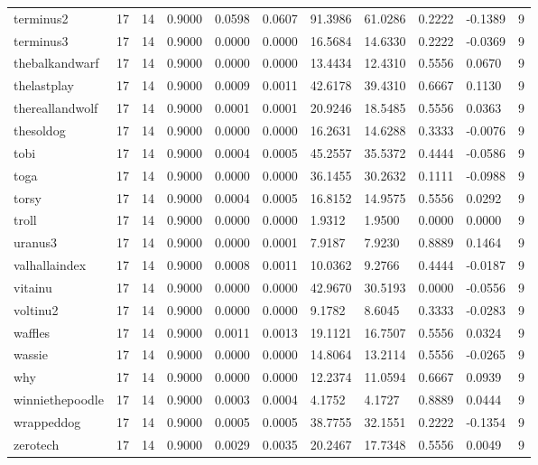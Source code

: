 \begin{table}[htbp]
\begin{tabular}{lllllllllll}
terminus2 & 17 & 14 & 0.9000 & 0.0598 & 0.0607 & 91.3986 & 61.0286 & 0.2222 & -0.1389 & 9 \\
terminus3 & 17 & 14 & 0.9000 & 0.0000 & 0.0000 & 16.5684 & 14.6330 & 0.2222 & -0.0369 & 9 \\
thebalkandwarf & 17 & 14 & 0.9000 & 0.0000 & 0.0000 & 13.4434 & 12.4310 & 0.5556 & 0.0670 & 9 \\
thelastplay & 17 & 14 & 0.9000 & 0.0009 & 0.0011 & 42.6178 & 39.4310 & 0.6667 & 0.1130 & 9 \\
thereallandwolf & 17 & 14 & 0.9000 & 0.0001 & 0.0001 & 20.9246 & 18.5485 & 0.5556 & 0.0363 & 9 \\
thesoldog & 17 & 14 & 0.9000 & 0.0000 & 0.0000 & 16.2631 & 14.6288 & 0.3333 & -0.0076 & 9 \\
tobi & 17 & 14 & 0.9000 & 0.0004 & 0.0005 & 45.2557 & 35.5372 & 0.4444 & -0.0586 & 9 \\
toga & 17 & 14 & 0.9000 & 0.0000 & 0.0000 & 36.1455 & 30.2632 & 0.1111 & -0.0988 & 9 \\
torsy & 17 & 14 & 0.9000 & 0.0004 & 0.0005 & 16.8152 & 14.9575 & 0.5556 & 0.0292 & 9 \\
troll & 17 & 14 & 0.9000 & 0.0000 & 0.0000 & 1.9312 & 1.9500 & 0.0000 & 0.0000 & 9 \\
uranus3 & 17 & 14 & 0.9000 & 0.0000 & 0.0001 & 7.9187 & 7.9230 & 0.8889 & 0.1464 & 9 \\
valhallaindex & 17 & 14 & 0.9000 & 0.0008 & 0.0011 & 10.0362 & 9.2766 & 0.4444 & -0.0187 & 9 \\
vitainu & 17 & 14 & 0.9000 & 0.0000 & 0.0000 & 42.9670 & 30.5193 & 0.0000 & -0.0556 & 9 \\
voltinu2 & 17 & 14 & 0.9000 & 0.0000 & 0.0000 & 9.1782 & 8.6045 & 0.3333 & -0.0283 & 9 \\
waffles & 17 & 14 & 0.9000 & 0.0011 & 0.0013 & 19.1121 & 16.7507 & 0.5556 & 0.0324 & 9 \\
wassie & 17 & 14 & 0.9000 & 0.0000 & 0.0000 & 14.8064 & 13.2114 & 0.5556 & -0.0265 & 9 \\
why & 17 & 14 & 0.9000 & 0.0000 & 0.0000 & 12.2374 & 11.0594 & 0.6667 & 0.0939 & 9 \\
winniethepoodle & 17 & 14 & 0.9000 & 0.0003 & 0.0004 & 4.1752 & 4.1727 & 0.8889 & 0.0444 & 9 \\
wrappeddog & 17 & 14 & 0.9000 & 0.0005 & 0.0005 & 38.7755 & 32.1551 & 0.2222 & -0.1354 & 9 \\
zerotech & 17 & 14 & 0.9000 & 0.0029 & 0.0035 & 20.2467 & 17.7348 & 0.5556 & 0.0049 & 9 \\

\end{tabular}
\end{table}
